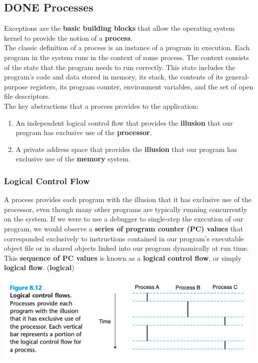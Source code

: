 \documentclass[11pt]{article}
\begin{document}
\subsection{{\bfseries\sffamily DONE} Processes}
\label{sec:orge1bc20e}
Exceptions are the \textbf{basic building blocks} that allow the operating system kernel to provide the notion of a \textbf{process}.\\

The classic definition of a process is an instance of a program in execution. Each program in the system runs in the context of some process. The context consists of the state that the program needs to run correctly. This state includes the program’s code and data stored in memory, its stack, the contents of its general- purpose registers, its program counter, environment variables, and the set of open file descriptors.\\

The key abstractions that a process provides to the application:\\
\begin{enumerate}
\item An independent logical control flow that provides the \textbf{illusion} that our program has exclusive use of the \textbf{processor}.\\
\item A private address space that provides the \textbf{illusion} that our program has exclusive use of the \textbf{memory} system.\\
\end{enumerate}


\subsubsection{Logical Control Flow}
\label{sec:org87fa722}
A process provides each program with the illusion that it has exclusive use of the processor, even though many other programs are typically running concurrently on the system. If we were to use a debugger to single-step the execution of our program, we would observe a \textbf{series of program counter (PC) values} that corresponded exclusively to instructions contained in our program’s executable object file or in shared objects linked into our program dynamically at run time. This \textbf{sequence of PC values} is known as a \textbf{logical control flow}, or simply \textbf{logical flow}. (\textbf{logical})\\

\begin{center}
\includegraphics[width=.9\linewidth]{pics/figure8.12-logical-controal-flows.png}
\end{center}
\end{document}
